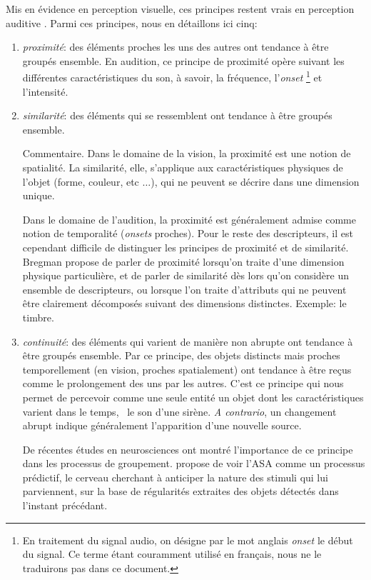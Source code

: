 Mis en évidence en perception visuelle, ces principes restent vrais en perception auditive \citep[ch. 1]{bregman1994auditory}. Parmi ces principes, nous en détaillons ici cinq:

\begin{enumerate}
\item \emph{proximité}: des éléments proches les uns des autres ont tendance à être groupés ensemble. En audition, ce principe de proximité opère suivant les différentes caractéristiques du son, à savoir, la fréquence, l'\emph{onset} \footnote{En traitement du signal audio, on désigne par le mot anglais \emph{onset} le début du signal. Ce terme étant couramment utilisé en français, nous ne le traduirons pas dans ce document.} et l'intensité.
 
\item \emph{similarité}: des éléments qui se ressemblent ont tendance à être groupés ensemble. 

Commentaire. Dans le domaine de la vision, la proximité est une notion de spatialité. La similarité, elle, s'applique aux caractéristiques physiques de l'objet (forme, couleur, etc $\ldots$), qui ne peuvent se décrire dans une dimension unique. 

Dans le domaine de l'audition, la proximité est généralement admise comme notion de temporalité (\emph{onsets} proches). Pour le reste des descripteurs, il est cependant difficile de distinguer les principes de proximité et de similarité. Bregman propose de parler de proximité lorsqu'on traite d'une dimension physique particulière, et de parler de similarité dès lors qu'on considère un ensemble de descripteurs, ou lorsque l'on traite d'attributs qui ne peuvent être clairement décomposés suivant des dimensions distinctes. Exemple: le timbre.

\item \emph{continuité}: des éléments qui varient de manière non abrupte ont tendance à être groupés ensemble. Par ce principe, des objets distincts mais proches temporellement (en vision, proches spatialement) ont tendance à être reçus comme le prolongement des uns par les autres. C'est ce principe qui nous permet de percevoir comme une seule entité un objet dont les caractéristiques varient dans le temps, \eg~le son d'une sirène. \emph{A contrario}, un changement abrupt indique généralement l'apparition d'une nouvelle source.

De récentes études en neurosciences ont montré l'importance de ce principe dans les processus de groupement. \citep{winkler2009modeling}  propose de voir l'ASA comme un processus prédictif, le cerveau cherchant à anticiper la nature des stimuli qui lui parviennent, sur la base de régularités extraites des objets détectés dans l'instant précédant.


\end{enumerate}
